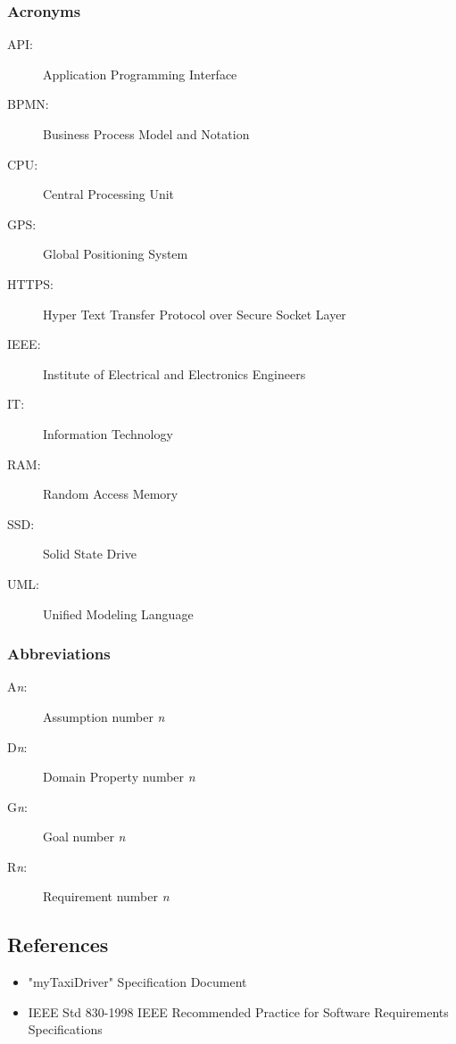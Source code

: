 \documentclass[a4paper]{article}
\begin{document}
\subsubsection{Acronyms}
\begin{description}
\item[API:] Application Programming Interface
\item[BPMN:] Business Process Model and Notation
\item[CPU:] Central Processing Unit
\item[GPS:] Global Positioning System
\item[HTTPS:] Hyper Text Transfer Protocol over Secure Socket Layer
\item[IEEE:] Institute of Electrical and Electronics Engineers
\item[IT:] Information Technology
\item[RAM:] Random Access Memory
\item[SSD:] Solid State Drive 
\item[UML:] Unified Modeling Language
\end{description}

\subsubsection{Abbreviations}
\begin{description}
\item[A\emph{n}:] Assumption number \emph{n}
\item[D\emph{n}:] Domain Property number \emph{n}
\item[G\emph{n}:] Goal number \emph{n}
\item[R\emph{n}:] Requirement number \emph{n}
\end{description}

\subsection{References}
\begin{itemize}
\item "myTaxiDriver" Specification Document
\item IEEE Std 830-1998 IEEE Recommended Practice for Software Requirements Specifications
\end{itemize}
\end{document}

